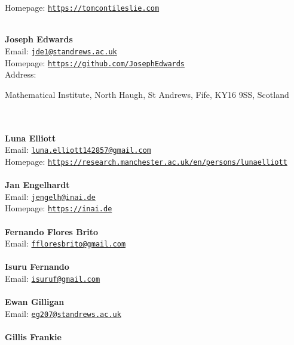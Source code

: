 \documentclass[a4paper,11pt]{report}
\begin{document}
\begin{titlepage}
{  Homepage: \href{https://tomcontileslie.com} {\texttt{https://tomcontileslie.com}}}\\
{\mbox{}\\
\small \noindent \textbf{ Joseph Edwards\\
    }  Email: \href{mailto://jde1@st-andrews.ac.uk} {\texttt{jde1@st\texttt{}andrews.ac.uk}}\\
  Homepage: \href{https://github.com/Joseph-Edwards} {\texttt{https://github.com/Joseph\texttt{}Edwards}}\\
  Address: \begin{minipage}[t]{8cm}\noindent
 Mathematical Institute, North Haugh, St Andrews, Fife, KY16 9SS, Scotland\\
 \end{minipage}
}\\
{\mbox{}\\
\small \noindent \textbf{ Luna Elliott\\
   }  Email: \href{mailto://luna.elliott142857@gmail.com} {\texttt{luna.elliott142857@gmail.com}}\\
  Homepage: \href{https://research.manchester.ac.uk/en/persons/luna-elliott} {\texttt{https://research.manchester.ac.uk/en/persons/luna\texttt{}elliott}}}\\
{\mbox{}\\
\small \noindent \textbf{ Jan Engelhardt\\
   }  Email: \href{mailto://jengelh@inai.de} {\texttt{jengelh@inai.de}}\\
  Homepage: \href{https://inai.de} {\texttt{https://inai.de}}}\\
{\mbox{}\\
\small \noindent \textbf{ Fernando Flores Brito\\
  }  Email: \href{mailto://ffloresbrito@gmail.com} {\texttt{ffloresbrito@gmail.com}}}\\
{\mbox{}\\
\small \noindent \textbf{ Isuru Fernando\\
  }  Email: \href{mailto://isuruf@gmail.com} {\texttt{isuruf@gmail.com}}}\\
{\mbox{}\\
\small \noindent \textbf{ Ewan Gilligan\\
  }  Email: \href{mailto://eg207@st-andrews.ac.uk} {\texttt{eg207@st\texttt{}andrews.ac.uk}}}\\
{\mbox{}\\
\small \noindent \textbf{ Gillis Frankie\\
}}
\end{titlepage}
\end{document}
